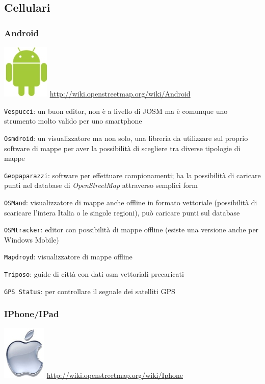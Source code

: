 \documentclass[a4paper,twoside,12pt,]{article}
\newcommand{\osm}{\emph{OpenStreetMap}\xspace}
\newcommand{\soft}[1]{\texttt{#1}}
\begin{document}
\subsection{Cellulari}
\subsubsection{Android} 
\includegraphics{./android-logo.jpg} \url{http://wiki.openstreetmap.org/wiki/Android}

\soft{Vespucci}: un buon editor, non è a livello di JOSM ma è comunque uno strumento molto valido per uno smartphone

\soft{Osmdroid}: un visualizzatore ma non solo, una libreria da utilizzare sul proprio software di mappe per aver la possibilità di scegliere tra diverse tipologie di mappe

\soft{Geopaparazzi}: software per effettuare campionamenti; ha la possibilità di caricare punti nel database di \osm attraverso semplici form 

\soft{OSMand}: visualizzatore di mappe anche offline in formato vettoriale (possibilità di scaricare l'intera Italia o le singole regioni), può caricare punti sul database

\soft{OSMtracker}: editor con possibilità di mappe offline (esiste una versione anche per Windows Mobile)

\soft{Mapdroyd}: visualizzatore di mappe offline

\soft{Triposo}: guide di città con dati osm vettoriali precaricati

\soft{GPS Status}: per controllare il segnale dei satelliti GPS

\subsubsection{IPhone/IPad}
\includegraphics{./iphone-logo.jpg} \url{http://wiki.openstreetmap.org/wiki/Iphone}
\end{document}

